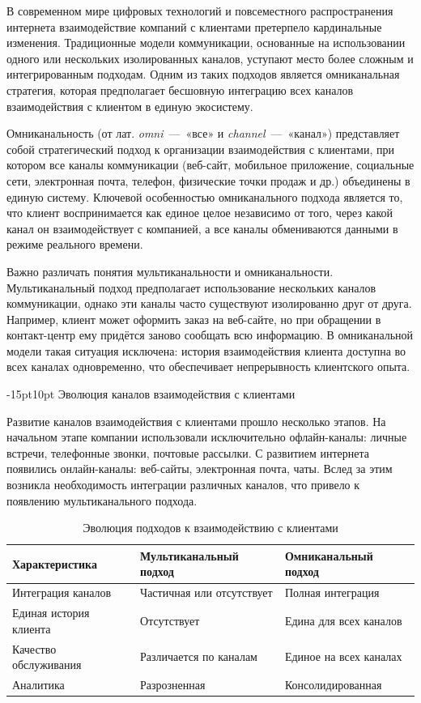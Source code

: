 \documentclass[12pt,a4paper]{report}
\makeatletter
\renewcommand{\section}{%
  \@startsection{section}{1}{\z@}%
  {-15pt}{10pt}%
  {\centering\normalfont\bfseries\large}}
\makeatother
\begin{document}
В современном мире цифровых технологий и повсеместного распространения интернета взаимодействие компаний с клиентами претерпело кардинальные изменения. Традиционные модели коммуникации, основанные на использовании одного или нескольких изолированных каналов, уступают место более сложным и интегрированным подходам. Одним из таких подходов является омниканальная стратегия, которая предполагает бесшовную интеграцию всех каналов взаимодействия с клиентом в единую экосистему.

Омниканальность (от лат. \textit{omni}~---~«все» и \textit{channel}~---~«канал») представляет собой стратегический подход к организации взаимодействия с клиентами, при котором все каналы коммуникации (веб-сайт, мобильное приложение, социальные сети, электронная почта, телефон, физические точки продаж и др.) объединены в единую систему. Ключевой особенностью омниканального подхода является то, что клиент воспринимается как единое целое независимо от того, через какой канал он взаимодействует с компанией, а все каналы обмениваются данными в режиме реального времени.

Важно различать понятия мультиканальности и омниканальности. Мультиканальный подход предполагает использование нескольких каналов коммуникации, однако эти каналы часто существуют изолированно друг от друга. Например, клиент может оформить заказ на веб-сайте, но при обращении в контакт-центр ему придётся заново сообщать всю информацию. В омниканальной модели такая ситуация исключена: история взаимодействия клиента доступна во всех каналах одновременно, что обеспечивает непрерывность клиентского опыта.

\section{Эволюция каналов взаимодействия с клиентами}

Развитие каналов взаимодействия с клиентами прошло несколько этапов. На начальном этапе компании использовали исключительно офлайн-каналы: личные встречи, телефонные звонки, почтовые рассылки. С развитием интернета появились онлайн-каналы: веб-сайты, электронная почта, чаты. Вслед за этим возникла необходимость интеграции различных каналов, что привело к появлению мультиканального подхода.

\begin{table}[ht]
\centering
\caption{Эволюция подходов к взаимодействию с клиентами}
\label{tab:evolution}
\begin{tabularx}{\textwidth}{|X|X|X|}
\hline
\textbf{Характеристика} & \textbf{Мультиканальный подход} & \textbf{Омниканальный подход} \\ \hline
Интеграция каналов & Частичная или отсутствует & Полная интеграция \\ \hline
Единая история клиента & Отсутствует & Едина для всех каналов \\ \hline
Качество обслуживания & Различается по каналам & Единое на всех каналах \\ \hline
Аналитика & Разрозненная & Консолидированная \\ \hline
\end{tabularx}
\end{table}
\end{document}
